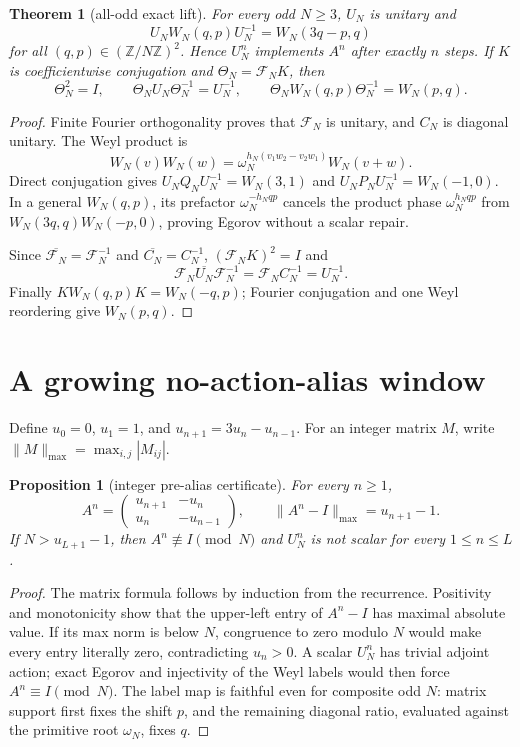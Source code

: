 \documentclass[11pt]{article}
\newtheorem{theorem}{Theorem}
\newtheorem{proposition}{Proposition}
\begin{document}
\begin{theorem}[all-odd exact lift]\label{thm:lift}
For every odd $N\ge3$, $U_N$ is unitary and
\[
 U_NW_N(q,p)U_N^{-1}=W_N(3q-p,q)
\]
for all $(q,p)\in(\mathbb Z/N\mathbb Z)^2$.  Hence $U_N^n$ implements
$A^n$ after exactly $n$ steps.  If $K$ is coefficientwise conjugation and
$\Theta_N=\mathcal F_NK$, then
\[
 \Theta_N^2=I,\qquad
 \Theta_NU_N\Theta_N^{-1}=U_N^{-1},\qquad
 \Theta_NW_N(q,p)\Theta_N^{-1}=W_N(p,q).
\]
\end{theorem}

\begin{proof}
Finite Fourier orthogonality proves that $\mathcal F_N$ is unitary, and
$C_N$ is diagonal unitary.  The Weyl product is
\[
 W_N(v)W_N(w)=
 \omega_N^{h_N(v_1w_2-v_2w_1)}W_N(v+w).
\]
Direct conjugation gives
$U_NQ_NU_N^{-1}=W_N(3,1)$ and
$U_NP_NU_N^{-1}=W_N(-1,0)$.  In a general $W_N(q,p)$, its prefactor
$\omega_N^{-h_Nqp}$ cancels the product phase
$\omega_N^{h_Nqp}$ from $W_N(3q,q)W_N(-p,0)$, proving Egorov without a
scalar repair.

Since $\overline{\mathcal F_N}=\mathcal F_N^{-1}$ and
$\overline{C_N}=C_N^{-1}$,
$(\mathcal F_NK)^2=I$ and
\[
 \mathcal F_N\overline{U_N}\mathcal F_N^{-1}
 =\mathcal F_NC_N^{-1}=U_N^{-1}.
\]
Finally $KW_N(q,p)K=W_N(-q,p)$; Fourier conjugation and one Weyl reordering
give $W_N(p,q)$.
\end{proof}

\section{A growing no-action-alias window}

Define $u_0=0$, $u_1=1$, and $u_{n+1}=3u_n-u_{n-1}$.
For an integer matrix $M$, write
$\|M\|_{\max}=\max_{i,j}|M_{ij}|$.

\begin{proposition}[integer pre-alias certificate]\label{prop:window}
For every $n\ge1$,
\[
 A^n=\begin{pmatrix}u_{n+1}&-u_n\\u_n&-u_{n-1}\end{pmatrix},\qquad
 \|A^n-I\|_{\max}=u_{n+1}-1.
\]
If $N>u_{L+1}-1$, then $A^n\not\equiv I\pmod N$ and $U_N^n$ is not scalar
for every $1\le n\le L$.
\end{proposition}

\begin{proof}
The matrix formula follows by induction from the recurrence.  Positivity and
monotonicity show that the upper-left entry of $A^n-I$ has maximal absolute
value.  If its max norm is below $N$, congruence to zero modulo $N$ would make
every entry literally zero, contradicting $u_n>0$.  A scalar $U_N^n$ has
trivial adjoint action; exact Egorov and injectivity of the Weyl labels would
then force $A^n\equiv I\pmod N$.  The label map is faithful even for
composite odd $N$: matrix support first fixes the shift $p$, and the remaining
diagonal ratio, evaluated against the primitive root $\omega_N$, fixes $q$.
\end{proof}
\end{document}

